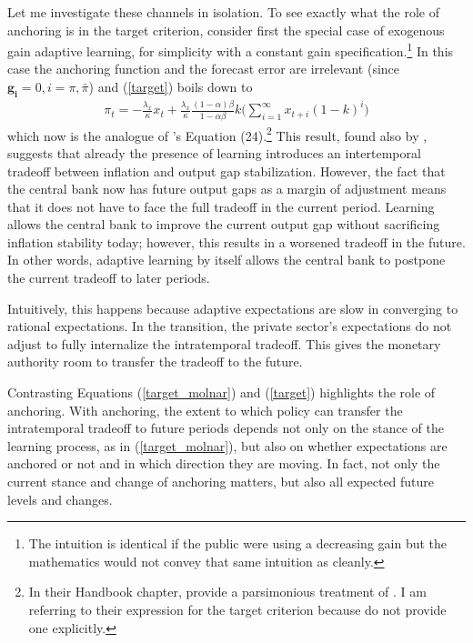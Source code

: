\documentclass[11pt]{article}
\renewcommand{\[}{\begin{equation}}
\renewcommand{\]}{\end{equation}}
\begin{document}
Let me investigate these channels in isolation. To see exactly what the role of anchoring is in the target criterion, consider first the special case of exogenous gain adaptive learning, for simplicity with a constant gain specification.\footnote{The intuition is identical if the public were using a decreasing gain but the mathematics would not convey that same intuition as cleanly.} In this case the anchoring function and the forecast error are irrelevant (since $\mathbf{g_i}=0, i=\pi,\bar{\pi}$) and (\ref{target}) boils down to
\begin{align}
\pi_t  = -\frac{\lambda_x}{\kappa}x_t + \frac{\lambda_x}{\kappa} \frac{(1-\alpha)\beta}{1-\alpha\beta} k
\bigg(\sum_{i=1}^{\infty}x_{t+i}(1-k)^i \bigg)
\label{target_molnar} %
\end{align}
which now is the analogue of \cite{gaspar2010inflation}'s Equation (24).\footnote{In their Handbook chapter, \cite{gaspar2010inflation} provide a parsimonious treatment of \cite{molnar2014optimal}. I am referring to their expression for the target criterion because \cite{molnar2014optimal} do not provide one explicitly.} This result, found also by \cite{molnar2014optimal}, suggests that already the presence of learning introduces an intertemporal tradeoff between inflation and output gap stabilization. However, the fact that the central bank now has future output gaps as a margin of adjustment means that it does not have to face the full tradeoff in the current period. Learning allows the central bank to improve the current output gap without sacrificing inflation stability today; however, this results in a worsened tradeoff in the future. In other words, adaptive learning by itself allows the central bank to postpone the current tradeoff to later periods. 

Intuitively, this happens because adaptive expectations are slow in converging to rational expectations. In the transition, the private sector's expectations do not adjust to fully internalize the intratemporal tradeoff. This gives the monetary authority room to transfer the tradeoff to the future.

Contrasting Equations (\ref{target_molnar}) and (\ref{target}) highlights the role of anchoring. With anchoring, the extent to which policy can transfer the intratemporal tradeoff to future periods depends not only on the stance of the learning process, as in (\ref{target_molnar}), but also on whether expectations are anchored or not and in which direction they are moving. In fact, not only the current stance and change of anchoring matters, but also all expected future levels and changes. 
\end{document}
